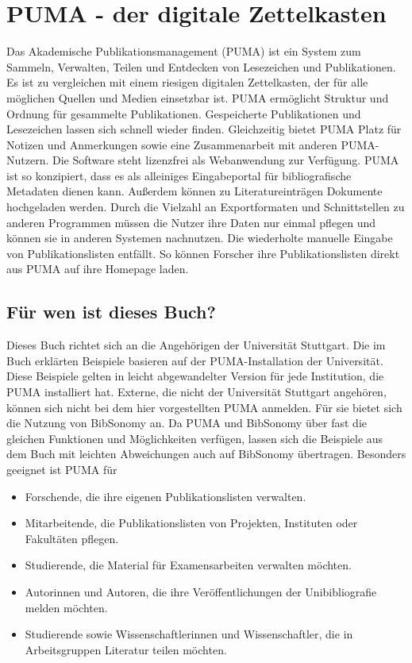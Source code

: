 \chapter{PUMA - der digitale Zettelkasten}
Das Akademische Publikationsmanagement (PUMA) ist ein System zum Sammeln, Verwalten, Teilen 
und Entdecken von Lesezeichen und Publikationen.\newline
Es ist zu vergleichen mit einem riesigen digitalen 
Zettelkasten, der für alle möglichen Quellen und Medien einsetzbar ist. PUMA 
ermöglicht Struktur und Ordnung für gesammelte Publikationen. Gespeicherte 
Publikationen und Lesezeichen lassen sich schnell wieder finden. Gleichzeitig 
bietet PUMA Platz für Notizen und Anmerkungen sowie eine Zusammenarbeit mit 
anderen PUMA-Nutzern. 
Die Software steht lizenzfrei als Webanwendung zur Verfügung.
\newline 
PUMA ist so konzipiert, dass es als alleiniges Eingabeportal für bibliografische Metadaten dienen kann. Außerdem können zu Literatureinträgen Dokumente hochgeladen werden. \newline
Durch die Vielzahl an Exportformaten und Schnittstellen zu anderen Programmen müssen die Nutzer ihre Daten nur einmal pflegen und können sie in anderen Systemen nachnutzen. Die wiederholte manuelle Eingabe von Publikationslisten entfällt. So können Forscher ihre Publikationslisten direkt aus PUMA auf ihre Homepage laden.  
\section{Für wen ist dieses Buch?} 
Dieses Buch richtet sich an die Angehörigen der Universität Stuttgart.
Die im Buch erklärten Beispiele basieren auf der PUMA-Installation der 
Universität. Diese Beispiele gelten in leicht abgewandelter 
Version für jede Institution, die PUMA installiert hat. 
\newline
Externe, die nicht der Universität Stuttgart angehören, können sich nicht bei 
dem hier vorgestellten PUMA anmelden. Für sie bietet sich die Nutzung 
von BibSonomy an. Da PUMA und BibSonomy über fast die gleichen Funktionen und 
Möglichkeiten verfügen, lassen sich die Beispiele aus dem Buch mit leichten 
Abweichungen auch auf BibSonomy übertragen.\newline
Besonders geeignet ist PUMA für
\begin{itemize}
\item Forschende, die ihre eigenen Publikationslisten verwalten.
\item Mitarbeitende, die Publikationslisten von Projekten, 
Instituten oder Fakultäten pflegen.
\item Studierende, die Material für Examensarbeiten verwalten 
möchten.
\item Autorinnen und Autoren, die ihre Veröffentlichungen der Unibibliografie 
melden möchten.
\item Studierende sowie Wissenschaftlerinnen und Wissenschaftler, 
die in Arbeitsgruppen Literatur teilen möchten.
\end{itemize}
